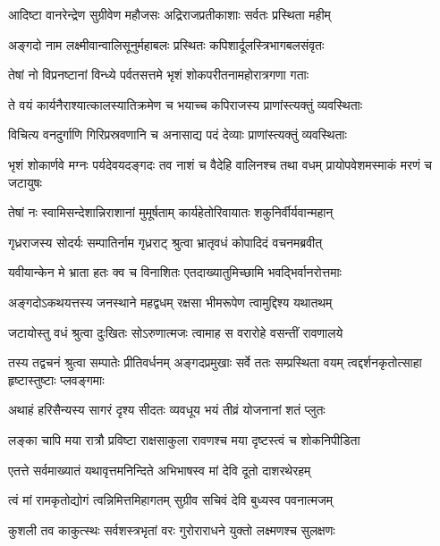 \twolineshloka
{आदिष्टा वानरेन्द्रेण सुग्रीवेण महौजसः}
{अद्रिराजप्रतीकाशाः सर्वतः प्रस्थिता महीम्} %

\twolineshloka
{अङ्गदो नाम लक्ष्मीवान्वालिसूनुर्महाबलः}
{प्रस्थितः कपिशार्दूलस्त्रिभागबलसंवृतः} %

\twolineshloka
{तेषां नो विप्रनष्टानां विन्ध्ये पर्वतसत्तमे}
{भृशं शोकपरीतनामहोरात्रगणा गताः} %

\twolineshloka
{ते वयं कार्यनैराश्यात्कालस्यातिक्रमेण च}
{भयाच्च कपिराजस्य प्राणांस्त्यक्तुं व्यवस्थिताः} %

\twolineshloka
{विचित्य वनदुर्गाणि गिरिप्रस्रवणानि च}
{अनासाद्य पदं देव्याः प्राणांस्त्यक्तुं व्यवस्थिताः} %

\threelineshloka
{भृशं शोकार्णवे मग्नः पर्यदेवयदङ्गदः}
{तव नाशं च वैदेहि वालिनश्च तथा वधम्}
{प्रायोपवेशमस्माकं मरणं च जटायुषः} %

\twolineshloka
{तेषां नः स्वामिसन्देशान्निराशानां मुमूर्षताम्}
{कार्यहेतोरिवायातः शकुनिर्वीर्यवान्महान्} %

\twolineshloka
{गृध्रराजस्य सोदर्यः सम्पातिर्नाम गृध्रराट्}
{श्रुत्वा भ्रातृवधं कोपादिदं वचनमब्रवीत्} %

\twolineshloka
{यवीयान्केन मे भ्राता हतः क्व च विनाशितः}
{एतदाख्यातुमिच्छामि भवद्भिर्वानरोत्तमाः} %

\twolineshloka
{अङ्गदोऽकथयत्तस्य जनस्थाने महद्वधम्}
{रक्षसा भीमरूपेण त्वामुद्दिश्य यथातथम्} %

\twolineshloka
{जटायोस्तु वधं श्रुत्वा दुःखितः सोऽरुणात्मजः}
{त्वामाह स वरारोहे वसन्तीं रावणालये} %

\threelineshloka
{तस्य तद्वचनं श्रुत्वा सम्पातेः प्रीतिवर्धनम्}
{अङ्गदप्रमुखाः सर्वे ततः सम्प्रस्थिता वयम्}
{त्वद्दर्शनकृतोत्साहा हृष्टास्तुष्टाः प्लवङ्गमाः} %

\twolineshloka
{अथाहं हरिसैन्यस्य सागरं दृश्य सीदतः}
{व्यवधूय भयं तीव्रं योजनानां शतं प्लुतः} %

\twolineshloka
{लङ्का चापि मया रात्रौ प्रविष्टा राक्षसाकुला}
{रावणश्च मया दृष्टस्त्वं च शोकनिपीडिता} %

\twolineshloka
{एतत्ते सर्वमाख्यातं यथावृत्तमनिन्दिते}
{अभिभाषस्व मां देवि दूतो दाशरथेरहम्} %

\twolineshloka
{त्वं मां रामकृतोद्योगं त्वन्निमित्तमिहागतम्}
{सुग्रीव सचिवं देवि बुध्यस्व पवनात्मजम्} %

\twolineshloka
{कुशली तव काकुत्स्थः सर्वशस्त्रभृतां वरः}
{गुरोराराधने युक्तो लक्ष्मणश्च सुलक्षणः} %

